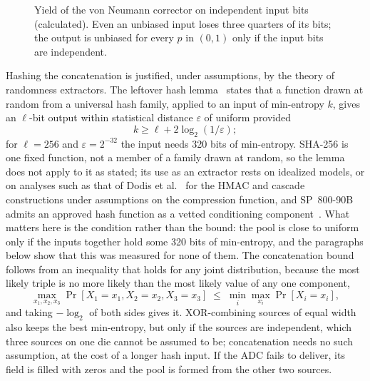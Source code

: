 \begin{figure}[htbp]
\centering
{}
\caption{Yield of the von Neumann corrector on independent input bits
(calculated). Even an unbiased input loses three quarters of its bits;
the output is unbiased for every $p$ in $(0,1)$ only if the input bits are
independent.}
\label{fig:esp32_vn}
\end{figure}

Hashing the concatenation is justified, under assumptions, by the theory
of randomness extractors. The leftover hash
lemma~\cite{impagliazzo_1989_pseudorandom} states that a function drawn at
random from a universal hash family, applied to an input of min-entropy
$k$, gives an $\ell$-bit output within statistical distance $\varepsilon$
of uniform provided
\begin{equation}
k \geq \ell + 2\log_2(1/\varepsilon);
\label{eq:esp32_lhl}
\end{equation}
for $\ell = 256$ and $\varepsilon = 2^{-32}$ the input needs 320 bits of
min-entropy. SHA-256 is one fixed function, not a member of a family drawn
at random, so the lemma does not apply to it as stated; its use as an
extractor rests on idealized models, or on analyses such as that of Dodis
et al.~\cite{dodis_2004_randomness} for the HMAC and cascade
constructions under assumptions on the compression function, and
SP~800-90B admits an approved hash function as a vetted conditioning
component~\cite{turan_2018_sp80090b}. What matters here is the condition
rather than the bound: the pool is close to uniform only if the inputs
together hold some 320 bits of min-entropy, and the paragraphs below show
that this was measured for none of them. The concatenation bound follows
from an inequality that holds for any joint distribution, because the
most likely triple is no more likely than the most likely value of any
one component,
\begin{equation}
\max_{x_1,x_2,x_3}\Pr[X_1{=}x_1,X_2{=}x_2,X_3{=}x_3]
\;\leq\; \min_i \max_{x_i}\Pr[X_i{=}x_i],
\end{equation}
and taking $-\log_2$ of both sides gives it. XOR-combining sources of
equal width also keeps the best min-entropy, but only if the sources are
independent, which three sources on one die cannot be assumed to be;
concatenation needs no such assumption, at the cost of a longer hash
input. If the ADC fails to deliver, its field is filled with zeros and the
pool is formed from the other two sources.

